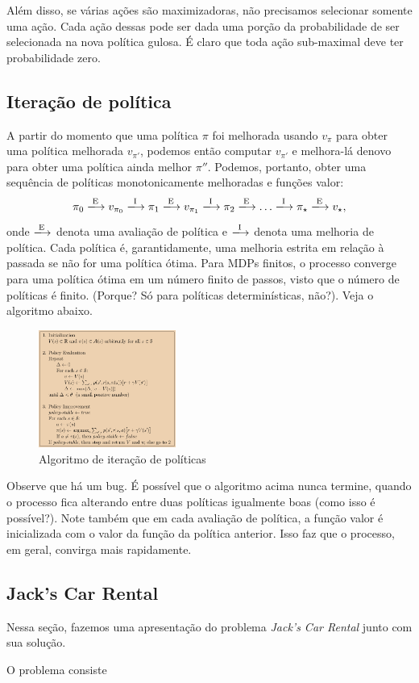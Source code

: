 \documentclass{article}
\begin{document}
Além disso, se várias ações são maximizadoras, não precisamos selecionar somente uma ação. Cada ação dessas pode ser dada uma porção da probabilidade de ser selecionada na nova política gulosa. É claro que toda ação sub-maximal deve ter probabilidade zero.

\newpage

\subsection{Iteração de política}
A partir do momento que uma política $\pi$ foi melhorada usando $v_{\pi}$ para obter uma política melhorada $v_{\pi'}$, podemos então computar $v_{\pi'}$ e melhora-lá denovo para obter uma política ainda melhor $\pi''$. Podemos, portanto, obter uma sequência de políticas monotonicamente melhoradas e funções valor:
\[
  \pi_0 \xlongrightarrow[]{\text{E}} v_{\pi_0} \xlongrightarrow[]{\text{I}} \pi_1 \xlongrightarrow[]{\text{E}} v_{\pi_1} \xlongrightarrow[]{\text{I}} \pi_2 \xlongrightarrow[]{\text{E}} \ldots \xlongrightarrow[]{\text{I}} \pi_{\star} \xlongrightarrow[]{\text{E}} v_{\star} 
,\] 
onde $\xlongrightarrow[]{\text{E}}$ denota uma avaliação de política e $\xlongrightarrow[]{\text{I}}$ denota uma melhoria de política. Cada política é, garantidamente, uma melhoria estrita em relação à passada se não for uma política ótima. Para MDPs finitos, o processo converge para uma política ótima em um número finito de passos, visto que o número de políticas é finito. (Porque? Só para políticas determinísticas, não?). Veja o algoritmo abaixo.

\begin{figure}[htpb]
  \centering
  \includegraphics[width=0.4\textwidth]{fig4.3.png}
  \caption{Algoritmo de iteração de políticas}
  \label{fig:fig4-3-png}
\end{figure}


Observe que há um bug. É possível que o algoritmo acima nunca termine, quando o processo fica alterando entre duas políticas igualmente boas (como isso é possível?). Note também que em cada avaliação de política, a função valor é inicializada com o valor da função da política anterior. Isso faz que o processo, em geral, convirga mais rapidamente.

\subsection{Jack's Car Rental}
Nessa seção, fazemos uma apresentação do problema \textit{Jack's Car Rental} junto com sua solução.

O problema consiste 
\end{document}
